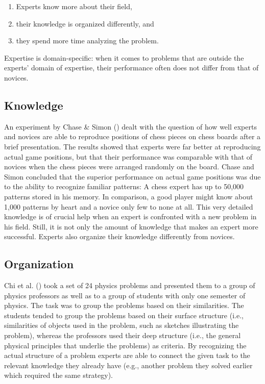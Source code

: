\documentclass[
]{krantz}
\begin{document}
\begin{enumerate}
\def\labelenumi{\arabic{enumi}.}
\item
  Experts know more about their field,
\item
  their knowledge is organized differently, and
\item
  they spend more time analyzing the problem.
\end{enumerate}

Expertise is domain-specific: when it comes to problems that are outside the experts' domain of expertise, their performance often does not differ from that of novices.

\subsection*{Knowledge}\label{knowledge-1}


An experiment by Chase \& Simon () dealt with the question of how well experts and novices are able to reproduce positions of chess pieces on chess boards after a brief presentation. The results showed that experts were far better at reproducing actual game positions, but that their performance was comparable with that of novices when the chess pieces were arranged randomly on the board. Chase and Simon concluded that the superior performance on actual game positions was due to the ability to recognize familiar patterns: A chess expert has up to 50,000 patterns stored in his memory. In comparison, a good player might know about 1,000 patterns by heart and a novice only few to none at all. This very detailed knowledge is of crucial help when an expert is confronted with a new problem in his field. Still, it is not only the amount of knowledge that makes an expert more successful. Experts also organize their knowledge differently from novices.

\subsection*{Organization}\label{organization}


Chi et al. () took a set of 24 physics problems and presented them to a group of physics professors as well as to a group of students with only one semester of physics. The task was to group the problems based on their similarities. The students tended to group the problems based on their surface structure (i.e., similarities of objects used in the problem, such as sketches illustrating the problem), whereas the professors used their deep structure (i.e., the general physical principles that underlie the problems) as criteria. By recognizing the actual structure of a problem experts are able to connect the given task to the relevant knowledge they already have (e.g., another problem they solved earlier which required the same strategy).
\end{document}
